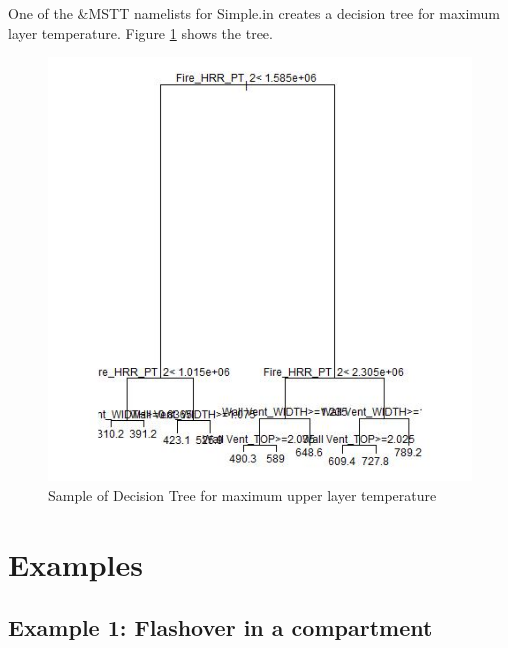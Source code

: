 \documentclass[12pt,twoside]{book}
\begin{document}
One of the {\ct \&MSTT} namelists for Simple.in creates a decision tree for maximum layer temperature. Figure \ref{simple_tree_temp} shows the tree.

\begin{figure}[h!]
\centering
\includegraphics[width=6.5in]{FIGURES/simple_tree_temp.jpeg}
\caption{Sample of Decision Tree for maximum upper layer temperature}
\label{simple_tree_temp}
\end{figure}

%
%

\chapter{Examples}

%
%

\section{Example 1: Flashover in a compartment}
\end{document}
